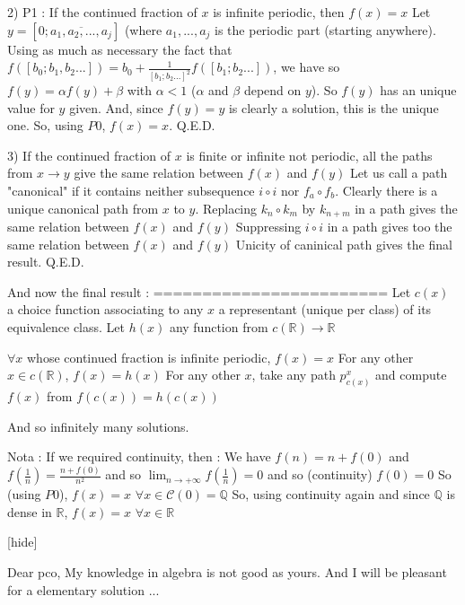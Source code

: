 \begin{solution}
2) P1 : If the continued fraction of $ x$ is infinite periodic, then $ f(x)=x$
Let $ y=[0;\overline{a_1,a_2,...,a_j}]$ (where $ a_1,...,a_j$ is the periodic part (starting anywhere).
Using as much as necessary the fact that $ f([b_0;b_1,b_2...])=b_0+\frac{1}{[b_1;b_2...]^2}f([b_1;b_2...])$, we have so $ f(y)=\alpha f(y)+\beta$ with $ \alpha < 1$ ($ \alpha$ and $ \beta$ depend on $ y$).
So $ f(y)$ has an unique value for $ y$ given. And, since $ f(y)=y$ is clearly a solution, this is the unique one.
So, using $ P0$, $ f(x)=x$.
Q.E.D.

3) If the continued fraction of $ x$ is finite or infinite not periodic, all the paths from $ x\to y$ give the same relation between $ f(x)$ and $ f(y)$
Let us call a path "canonical" if it contains neither subsequence $ i\circ i$ nor $ f_a\circ f_b$. Clearly there is a unique canonical path from $ x$ to $ y$.
Replacing $ k_n\circ k_m$ by $ k_{n+m}$ in a path gives the same relation between $ f(x)$ and $ f(y)$
Suppressing $ i\circ i$ in a path gives too the same relation between $ f(x)$ and $ f(y)$
Unicity of caninical path gives the final result.
Q.E.D.

And now the final result :
========================
Let $ c(x)$ a choice function associating to any $ x$ a representant (unique per class) of its equivalence class.
Let $ h(x)$ any function from $ c(\mathbb R)\to \mathbb R$
 
$ \forall x$ whose continued fraction is infinite periodic, $ f(x)=x$
For any other $ x\in c(\mathbb R)$, $ f(x)=h(x)$
For any other $ x$, take any path $ p_{c(x)}^x$ and compute $ f(x)$ from $ f(c(x))=h(c(x))$

And so infinitely many solutions.

Nota : If we required continuity, then :
We have $ f(n)=n+f(0)$ and $ f(\frac{1}{n})=\frac{n+f(0)}{n^2}$ and so $ \lim_{n\to +\infty}f(\frac{1}{n})=0$ and so (continuity) $ f(0)=0$
So (using $ P0$), $ f(x)=x$ $ \forall x\in\mathcal C(0)=\mathbb Q$
So, using continuity again and since $ \mathbb Q$ is dense in $ \mathbb R$, $ f(x)=x$ $ \forall x\in \mathbb R$

[\/hide]
\end{solution}



\begin{solution}
	Dear pco,
My knowledge in algebra is not good as yours. And I will be pleasant for a elementary solution ...  
\end{solution}




